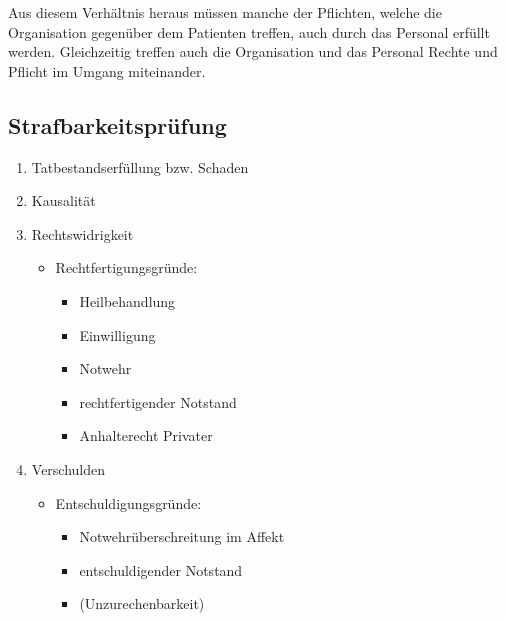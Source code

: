 Aus diesem Verhältnis heraus m\"ussen manche der Pflichten, welche die
Org\-anisation gegen\-\"uber dem Patienten treffen, auch
durch das Personal er\-f\"ullt werden. Gleich\-zeitig
treffen auch die Org\-anisation und das Personal Rechte und
Pflicht im Um\-gang mit\-ein\-ander.

\subsection{Strafbarkeitsprüfung}

\begin{enumerate}
\item Tatbestandserfüllung bzw. Schaden
\item Kausalit\"at
\item Rechtswidrigkeit

\begin{itemize}
\item {\mdseries
Rechtfertigungsgr\"unde:}


\begin{itemize}
\item {\mdseries
 Heilbehandlung }

\item {\mdseries
Einwilligung}

\item {\mdseries
Notwehr}

\item {\mdseries
rechtfertigender Notstand}

\item {\mdseries
Anhalterecht Privater}

\end{itemize}
\end{itemize}

\item Verschulden

\begin{itemize}
\item{\mdseries
Entschuldigungsgr\"unde:}


\begin{itemize}
\item Notwehr\"uberschreitung im Affekt
\item entschuldigender Notstand
\item (Unzurechenbarkeit)

\end{itemize}
\end{itemize}
\end{enumerate}

